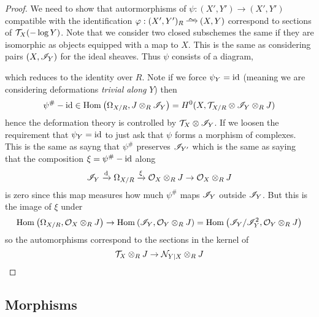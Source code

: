 \documentclass[12pt]{article}
\begin{document}
\begin{proof}
We need to show that autormorphisms of $\psi : (X', Y') \to (X', Y')$ compatible with the identification $\varphi : (X', Y')_{R} \iso (X, Y)$ correspond to sections of $\mathcal{T}_X(-\log{Y})$. Note that we consider two closed subschemes the same if they are isomorphic as objects equipped with a map to $X$. This is the same as considering pairs $(X, \mathscr{I}_Y)$ for the ideal sheaves. Thus $\psi$ consists of a diagram,
\begin{center}
\end{center} 
which reduces to the identity over $R$. Note if we force $\psi_Y = \mathrm{id}$ (meaning we are considering deformations \textit{trivial along} $Y$) then
\[ \psi^{\#} - \mathrm{id} \in \mathrm{Hom}_{} \left( \Omega_{X/R}, J \otimes_R \mathscr{I}_{Y} \right) = H^0(X, \mathcal{T}_{X/R} \otimes \mathscr{I}_{Y} \otimes_R J)  \]
hence the deformation theory is controlled by $\mathcal{T}_X \otimes \mathscr{I}_{Y}$. If we loosen the requirement that $\psi_Y = \mathrm{id}$ to just ask that $\psi$ forms a morphism of complexes. This is the same as sayng that $\psi^{\#}$ preserves $\mathscr{I}_{Y'}$ which is the same as saying that the composition $\xi = \psi^{\#} - \mathrm{id}$ along
\[ \mathscr{I}_{Y} \xrightarrow{\mathrm{d}} \Omega_{X/R} \xrightarrow{\xi} \mathcal{O}_{X} \otimes_R J \to \mathcal{O}_{X} \otimes_R J \]
is zero since this map measures how much $\psi^{\#}$ maps $\mathscr{I}_{Y}$ outside $\mathscr{I}_{Y}$. But this is the image of $\xi$ under
\[ \mathrm{Hom}_{} \left( \Omega_{X/R}, \mathcal{O}_{X} \otimes_R J \right) \to \mathrm{Hom}_{} \left( \mathscr{I}_Y, \mathcal{O}_{Y} \otimes_R J \right) = \mathrm{Hom}_{} \left( \mathscr{I}_Y / \mathscr{I}_Y^2, \mathcal{O}_{Y} \otimes_R J \right) \]
so the automorphisms correspond to the sections in the kernel of 
\[ \mathcal{T}_X \otimes_R J \to \mathcal{N}_{Y|X} \otimes_R J \]
\end{proof}

\subsection{Morphisms}
\end{document}
